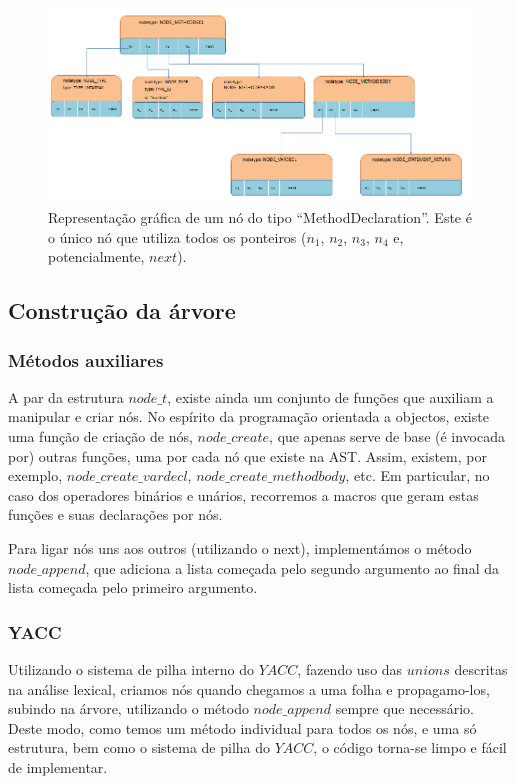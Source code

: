 \documentclass[11pt,a4paper]{article}
\begin{document}
\begin{figure}[H]
  \centering
      \includegraphics[width=\textwidth,height=\textheight,keepaspectratio]{Method_Decl.png}
  \caption{Representação gráfica de um nó do tipo ``MethodDeclaration''. Este é o único nó que utiliza todos os ponteiros ($n_1$, $n_2$, $n_3$, $n_4$ e, potencialmente, $next$).}
\end{figure}

\subsection{Construção da árvore}

\subsubsection{Métodos auxiliares}

A par da estrutura $node\_t$, existe ainda um conjunto de funções que auxiliam a manipular e criar nós. No espírito da programação orientada a objectos, existe uma função de criação de nós, $node\_create$, que apenas serve de base (é invocada por) outras funções, uma por cada nó que existe na AST. Assim, existem, por exemplo, $node\_create\_vardecl$, $node\_create\_methodbody$, etc. Em particular, no caso dos operadores binários e unários, recorremos a macros que geram estas funções e suas declarações por nós.

Para ligar nós uns aos outros (utilizando o next), implementámos o método $node\_append$, que adiciona a lista começada pelo segundo argumento ao final da lista começada pelo primeiro argumento.

\subsubsection{YACC}

Utilizando o sistema de pilha interno do $YACC$, fazendo uso das $unions$ descritas na análise lexical, criamos nós quando chegamos a uma folha e propagamo-los, subindo na árvore, utilizando o método $node\_append$ sempre que necessário. Deste modo, como temos um método individual para todos os nós, e uma só estrutura, bem como o sistema de pilha do $YACC$, o código torna-se limpo e fácil de implementar.
\end{document}
